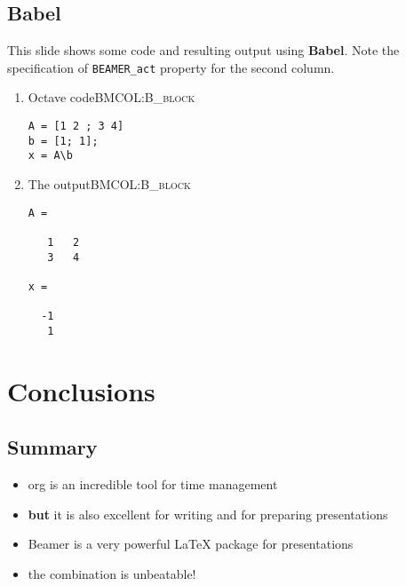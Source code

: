 \documentclass[bigger]{beamer}
\begin{document}
\subsection{Babel}
\label{sec:orgheadline11}
This slide shows some code and resulting output using \textbf{Babel}.  Note the specification of \texttt{BEAMER\_act} property for the second column.
\begin{enumerate}
\item Octave code\hfill{}\textsc{BMCOL:B\_block}
\label{sec:orgheadline9}
\begin{verbatim}
A = [1 2 ; 3 4]
b = [1; 1];
x = A\b
\end{verbatim}

\item The output\hfill{}\textsc{BMCOL:B\_block}
\label{sec:orgheadline10}
\begin{verbatim}
A =

   1   2
   3   4

x =

  -1
   1
\end{verbatim}
\end{enumerate}

\section{Conclusions}
\label{sec:orgheadline14}

\subsection{Summary}
\label{sec:orgheadline13}
\begin{itemize}
\item org is an incredible tool for time management
\item \textbf{but} it is also excellent for writing and for preparing presentations
\item Beamer is a very powerful \LaTeX{} package for presentations
\item the combination is unbeatable!
\end{itemize}
\end{document}

